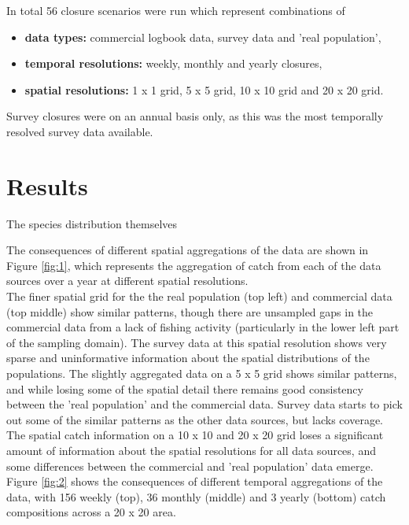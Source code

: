 \documentclass[review]{elsarticle}
\begin{document}
In total 56 closure scenarios were run which represent combinations of

\begin{itemize}
	\item \textbf{data types:} commercial logbook data, survey data and
		'real population',
	\item \textbf{temporal resolutions:} weekly, monthly and yearly
		closures,
	\item \textbf{spatial resolutions:} 1 x 1 grid, 5 x 5 grid, 10 x 10
		grid and 20 x 20 grid.
\end{itemize}

Survey closures were on an annual basis only, as this was the most temporally
resolved survey data available.

\section{Results}

The species distribution themselves 

The consequences of different spatial aggregations of the data are shown in
Figure \ref{fig:1}, which represents the aggregation of catch from each of the
data sources over a year at different spatial resolutions. \\

The finer spatial grid for the the real population (top left) and commercial
data (top middle) show similar patterns, though there are unsampled gaps in the
commercial data from a lack of fishing activity (particularly in the lower left
part of the sampling domain). The survey data at this spatial resolution shows
very sparse and uninformative information about the spatial distributions of
the populations. The slightly aggregated data on a 5 x 5 grid shows similar
patterns, and while losing some of the spatial detail there remains good
consistency between the 'real population' and the commercial data. Survey data
starts to pick out some of the similar patterns as the other data sources, but
lacks coverage. The spatial catch information on a 10 x 10 and 20 x 20 grid
loses a significant amount of information about the spatial resolutions for all
data sources, and some differences between the commercial and 'real population'
data emerge. \\

Figure \ref{fig:2} shows the consequences of different temporal aggregations of
the data, with 156 weekly (top), 36 monthly (middle) and 3 yearly (bottom)
catch compositions across a 20 x 20 area. \\
\end{document}
